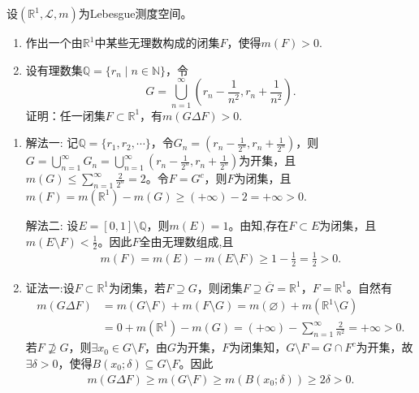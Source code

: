 \documentclass[../../main.tex]{subfiles}%
\begin{document}
\begin{example}
设$(\mathbb{R}^1,\mathscr{L},m)$为Lebesgue测度空间。
\begin{enumerate}[(1)]
\item 作出一个由$\mathbb{R}^1$中某些无理数构成的闭集$F$，使得$m(F)>0$.
\item 设有理数集$\mathbb{Q}=\{r_n\mid n\in\mathbb{N}\}$，令
\[
G = \bigcup\limits_{n=1}^{\infty}\left(r_n - \frac{1}{n^2}, r_n + \frac{1}{n^2}\right).
\]
证明：任一闭集$F\subset\mathbb{R}^1$，有$m(G\Delta F)>0$.
\end{enumerate}
\end{example}
\begin{solution}
\begin{enumerate}[(1)]
\item {\color{blue}解法一:} 记$\mathbb{Q}=\{r_1,r_2,\cdots\}$，令$G_n=\left(r_n-\frac{1}{2^n},r_n+\frac{1}{2^n}\right)$，则$G=\bigcup\limits_{n=1}^{\infty}G_n=\bigcup\limits_{n=1}^{\infty}\left(r_n-\frac{1}{2^n},r_n+\frac{1}{2^n}\right)$为开集，且$m(G)\leqslant\sum\limits_{n=1}^{\infty}\frac{2}{2^n}=2$。令$F=G^c$，则$F$为闭集，且$m(F)=m(\mathbb{R}^1)-m(G)\geqslant(+\infty)-2=+\infty>0$.

{\color{blue}解法二:} 设$E=[0,1]\setminus\mathbb{Q}$，则$m(E)=1$。由知,存在$F\subset E$为闭集，且$m(E\setminus F)<\frac{1}{2}$。因此$F$全由无理数组成,且
\begin{align*}
m(F) = m(E)-m(E\setminus F)\geqslant 1-\frac{1}{2}=\frac{1}{2}>0.
\end{align*}
\end{enumerate}
\begin{enumerate}[(1)]
\setcounter{enumi}{1}
\item {\color{blue}证法一:}设$F\subset\mathbb{R}^1$为闭集，若$F\supseteq G$，则闭集$F\supseteq\overline{G}=\mathbb{R}^1$，$F=\mathbb{R}^1$。自然有
\begin{align*}
m(G\Delta F) &= m(G\setminus F)+m(F\setminus G) = m(\varnothing)+m(\mathbb{R}^1\setminus G) \\
&= 0+m(\mathbb{R}^1)-m(G) = (+\infty)-\sum\limits_{n=1}^{\infty}\frac{2}{n^2}=+\infty>0.
\end{align*}
若$F\nsupseteq G$，则$\exists x_0\in G\setminus F$，由$G$为开集，$F$为闭集知，$G\setminus F=G\cap F^c$为开集，故$\exists\delta>0$，使得$B(x_0;\delta)\subseteq G\setminus F$。因此
\begin{align*}
m(G\Delta F)\geqslant m(G\setminus F)\geqslant m(B(x_0;\delta))\geqslant 2\delta>0.
\end{align*}


\end{enumerate}
\end{solution}
\end{document}
